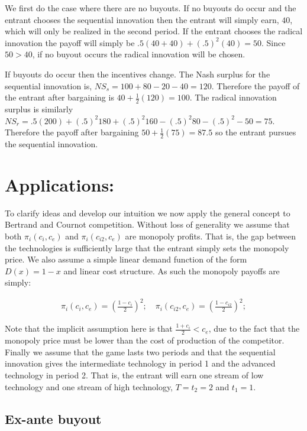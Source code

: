 \documentclass[11pt]{article}
\begin{document}
We first do the case where there are no buyouts. If no buyouts do occur and the entrant chooses the sequential innovation then the entrant will simply earn, $40$, which will only be realized in the second period. If the entrant chooses the radical innovation the payoff will simply be $.5(40+40)+(.5)^2(40)=50$. Since $50>40$, if no buyout occurs the radical innovation will be chosen. 

If buyouts do occur then the incentives change. The Nash surplus for the sequential innovation is, $NS_s = 100+80-20-40=120$. Therefore the payoff of the entrant after bargaining is $40+\frac{1}{2}(120)=100$. The radical innovation surplus is similarly $NS_r = .5(200)+(.5)^2 180+(.5)^2 160-(.5)^2 80-(.5)^2-50=75$. Therefore the payoff after bargaining $50+\frac{1}{2}(75)=87.5$ so the entrant pursues the sequential innovation. 

\section{Applications:}\label{application}

To clarify ideas and develop our intuition we now apply the general concept to Bertrand and Cournot competition. Without loss of generality we assume that both $\pi_i(c_i,c_e)$ and
$\pi_i(c_{i2},c_e)$ are monopoly profits. That is, the gap between the technologies is sufficiently large that the entrant simply sets the monopoly price. We also assume a simple linear demand function of the form $D(x)=1-x$ and linear cost structure.  As such the monopoly payoffs are simply: 

\begin{align*}
\pi_i(c_i,c_e) = 
\left(\frac{1-c_i}{2}\right)^2; \quad \pi_i(c_{i2},c_e) = \left(\frac{1-c_{i2}}{2}\right)^2;  
\end{align*}

Note that the implicit assumption here is that $\frac{1+c_i}{2}<c_e$, due to the fact that the monopoly price must be lower than the cost of production of the competitor. Finally we assume that the game lasts two periods and that the sequential innovation gives the intermediate technology in period 1 and the advanced technology in period 2. That is, the entrant will earn one stream of low technology and one stream of high technology, $T=t_2=2$ and $t_1=1$.

\subsection{Ex-ante buyout}
\end{document}
